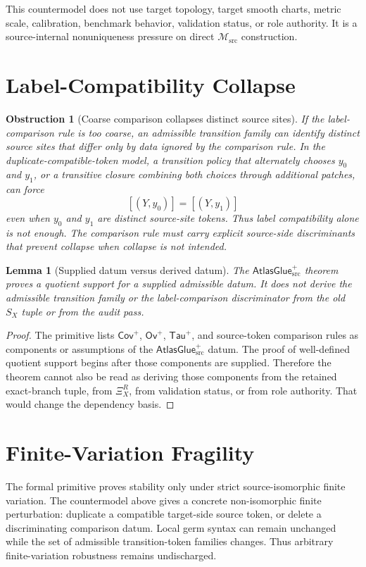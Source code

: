 \documentclass[11pt]{article}
\newcommand{\Msrc}{\mathcal{M}_{\mathrm{src}}}
\newcommand{\XiR}{\Xi_X^R}
\newcommand{\SX}{S_X}
\newcommand{\AtlasGlue}{\mathsf{AtlasGlue}_{\mathrm{src}}^{+}}
\newcommand{\Cov}{\mathsf{Cov}^{+}}
\newcommand{\Ov}{\mathsf{Ov}^{+}}
\newcommand{\Tau}{\mathsf{Tau}^{+}}
\newtheorem{obstruction}{Obstruction}
\newtheorem{lemma}{Lemma}
\begin{document}
This countermodel does not use target topology, target smooth charts, metric
scale, calibration, benchmark behavior, validation status, or role authority.
It is a source-internal nonuniqueness pressure on direct \(\Msrc\)
construction.

\section{Label-Compatibility Collapse}

\begin{obstruction}[Coarse comparison collapses distinct source sites]
If the label-comparison rule is too coarse, an admissible transition family can
identify distinct source sites that differ only by data ignored by the
comparison rule. In the duplicate-compatible-token model, a transition policy
that alternately chooses \(y_0\) and \(y_1\), or a transitive closure combining
both choices through additional patches, can force
\[
  [(Y,y_0)]=[(Y,y_1)]
\]
even when \(y_0\) and \(y_1\) are distinct source-site tokens. Thus label
compatibility alone is not enough. The comparison rule must carry explicit
source-side discriminants that prevent collapse when collapse is not intended.
\end{obstruction}

\begin{lemma}[Supplied datum versus derived datum]
The \(\AtlasGlue\) theorem proves a quotient support for a supplied admissible
datum. It does not derive the admissible transition family or the
label-comparison discriminator from the old \(\SX\) tuple or from the audit
pass.
\end{lemma}

\begin{proof}
The primitive lists \(\Cov\), \(\Ov\), \(\Tau\), and source-token comparison
rules as components or assumptions of the \(\AtlasGlue\) datum. The proof of
well-defined quotient support begins after those components are supplied.
Therefore the theorem cannot also be read as deriving those components from
the retained exact-branch tuple, from \(\XiR\), from validation status, or
from role authority. That would change the dependency basis.
\end{proof}

\section{Finite-Variation Fragility}

The formal primitive proves stability only under strict source-isomorphic
finite variation. The countermodel above gives a concrete non-isomorphic
finite perturbation: duplicate a compatible target-side source token, or
delete a discriminating comparison datum. Local germ syntax can remain
unchanged while the set of admissible transition-token families changes. Thus
arbitrary finite-variation robustness remains undischarged.
\end{document}

